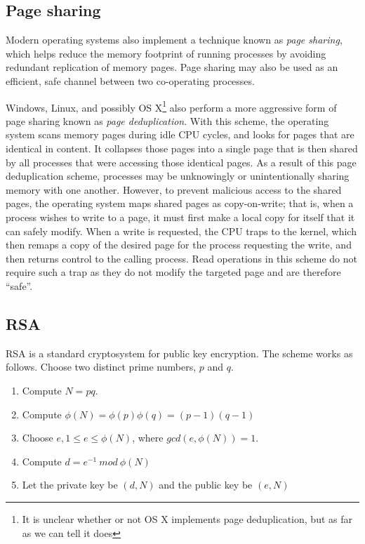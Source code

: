 \documentclass[11pt]{llncs}
\begin{document}
\subsection{Page sharing} %

Modern operating systems also implement a technique known as \textit{page
sharing}, which helps reduce the memory footprint of running processes by
avoiding redundant replication of memory pages. Page sharing may also be used as
an efficient, safe channel between two co-operating processes.

Windows, Linux, and possibly OS X\footnote{It is unclear whether or not OS X
implements page deduplication, but as far as we can tell it does} also perform a
more aggressive form of page sharing known as \textit{page deduplication}. With
this scheme, the operating system scans memory pages during idle CPU cycles, and
looks for pages that are identical in content. It collapses those pages into a
single page that is then shared by all processes that were accessing those
identical pages. As a result of this page deduplication scheme, processes may be
unknowingly or unintentionally sharing memory with one another. However, to
prevent malicious access to the shared pages, the operating system maps shared
pages as copy-on-write; that is, when a process wishes to write to a page, it
must first make a local copy for itself that it can safely modify. When a write
is requested, the CPU traps to the kernel, which then remaps a copy of the
desired page for the process requesting the write, and then returns control to
the calling process. Read operations in this scheme do not require such a trap
as they do not modify the targeted page and are therefore ``safe''.

\subsection{RSA}

RSA is a standard cryptosystem for public key encryption. The scheme works as
follows. Choose two distinct prime numbers, $p$ and $q$.

\begin{enumerate}
    \item Compute $N = pq$.
    \item Compute $\phi(N) = \phi(p)\phi(q) = (p-1)(q-1)$
    \item Choose $e, 1 \leq e \leq \phi(N)$, where $gcd(e,\phi(N)) = 1$.
    \item Compute $d = e^{-1}\ mod\ \phi(N)$
    \item Let the private key be $(d,N)$ and the public key be $(e,N)$
\end{enumerate}
\end{document}
